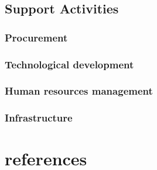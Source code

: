 \documentclass{article}
\begin{document}
  \subsection{Support Activities}
  \subsubsection{Procurement}
  \subsubsection{Technological development}
  \subsubsection{Human resources management}
  \subsubsection{Infrastructure}


  
  \section{references}
\end{document}

